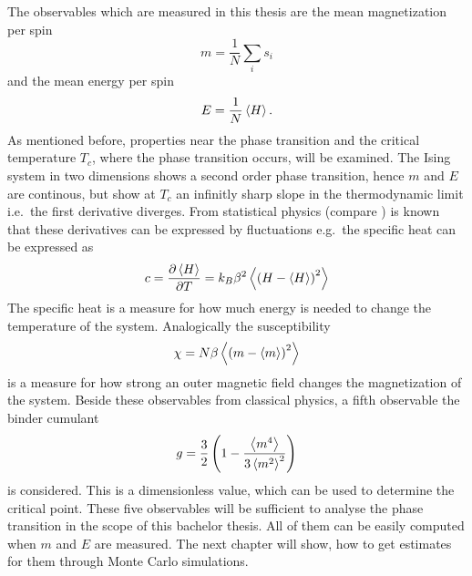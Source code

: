     The observables which are measured in this thesis are the mean
    magnetization per spin
    \begin{equation}
        m = \frac{1}{N} \sum_i s_i
    \end{equation}
    and the mean energy per spin
    \begin{equation}
        E = \frac{1}{N} \left< H \right>.
    \end{equation}
    As mentioned before, properties near the phase transition and the
    critical temperature \(T_c\), where the phase transition occurs, will
    be examined. The Ising system in two dimensions shows a second order
    phase transition, hence \(m\) and \(E\) are continous, but show at
    \(T_c\) an infinitly sharp slope in the thermodynamic limit i.e.\
    the first derivative diverges.
    From statistical physics (compare \cite{nolting2005}) is known that
    these derivatives can be expressed by fluctuations e.g.\ the specific
    heat can be expressed as
    \begin{equation}
        c = \frac{\partial \left< H \right>}{\partial T} = k_B \beta^2 \left< \left(H-\left< H \right>\right)^2 \right>
    \end{equation}
    The specific heat is a measure for how much energy is needed to change
    the temperature of the system.
    Analogically the susceptibility
    \begin{equation}
        \chi = N \beta \left< \left(m-\left< m \right>\right)^2 \right>
    \end{equation}
    is a measure for how strong an outer magnetic field changes the
    magnetization of the system.
    Beside these observables from classical physics, a fifth observable
    the binder cumulant \cite{Binder1981}
    \begin{equation}
        g = \frac{3}{2}\left(1-\frac{\left< m^4 \right>}{3\left< m^2 \right>^2}\right)
        \label{eq:binder}
    \end{equation}
    is considered.
    This is a dimensionless value, which can be used to determine the
    critical point. These five observables will be sufficient to analyse
    the phase transition in the scope of this bachelor thesis. All of them
    can be easily computed when \(m\) and \(E\) are measured. The next
    chapter will show, how to get estimates for them through Monte Carlo
    simulations.

